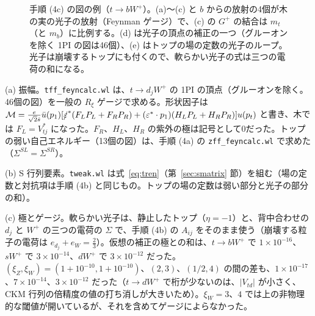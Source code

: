 \documentclass[a4paper,10pt]{ltjsarticle}
\begin{document}
\begin{figure}[tbp]
\caption{手順 (4c) の図の例（$t\to bW^+$）。(a)〜(c) と $b$ からの放射の4個が木の実の光子の放射（Feynman ゲージ）で、(c) の $G^+$ の結合は $m_t$（と $m_b$）に比例する。(d) は光子の頂点の補正の一つ（グルーオンを除く 1PI の図は46個）、(e) はトップの場の定数の光子のループ。光子は崩壊するトップにも付くので、軟らかい光子の式は三つの電荷の和になる。}
\label{fig:tnlo}
\end{figure}

(a) 振幅。\texttt{tff\_feyncalc.wl} は、$t\to d_jW^+$ の 1PI の頂点（グルーオンを除く。46個の図）を一般の $R_\xi$ ゲージで求める。形状因子は $\mathcal M=\frac{e}{\sqrt2\hat s}\bar u(p_1)[\slashed\varepsilon^*(F_LP_L+F_RP_R)+(\varepsilon^*\cdot p_1)(H_LP_L+H_RP_R)]u(p_t)$ と書き、木では $F_L=V_{tj}^*$ になった。$F_R$、$H_L$、$H_R$ の紫外の極は記号として0だった。トップの弱い自己エネルギー（13個の図）は、手順 (4a) の \texttt{zff\_feyncalc.wl} で求めた（$\Sigma^{SL}=\Sigma^{SR}$）。

(b) S 行列要素。\texttt{tweak.wl} は式~\eqref{eq:tren}（第~\ref{sec:smatrix} 節）を組む（場の定数と対抗項は手順 (4b) と同じもの。トップの場の定数は弱い部分と光子の部分の和）。

(c) 極とゲージ。軟らかい光子は、静止したトップ（$\eta=-1$）と、背中合わせの $d_j$ と $W^+$ の三つの電荷の $\Sigma$ で、手順 (4b) の $A_{ij}$ をそのまま使う（崩壊する粒子の電荷は $e_{d_j}+e_W=\frac23$）。仮想の補正の極との和は、$t\to bW^+$ で $1\times10^{-16}$、$sW^+$ で $3\times10^{-14}$、$dW^+$ で $3\times10^{-12}$ だった。$(\xi_Z,\xi_W)=(1+10^{-10},1+10^{-10})$、$(2,3)$、$(1/2,4)$ の間の差も、$1\times10^{-17}$、$7\times10^{-14}$、$3\times10^{-12}$ だった（$t\to dW^+$ で桁が少ないのは、$|V_{td}|$ が小さく、CKM 行列の倍精度の値の打ち消しが大きいため）。$\xi_W=3$、$4$ では上の非物理的な閾値が開いているが、それを含めてゲージによらなかった。
\end{document}
